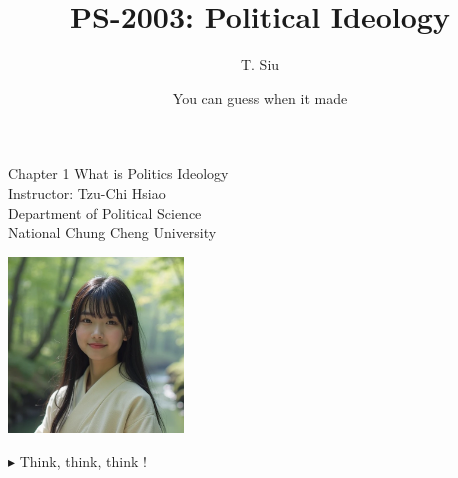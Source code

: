 \documentclass{beamer}
\title{PS-2003: Political Ideology}
\author{T. Siu}
\date{You can guess when it made}
\begin{document}
\begin{frame}
\begin{center}
\Large{Chapter 1 What is Politics Ideology} \\
\vspace{3em}
\normalsize{Instructor: Tzu-Chi Hsiao} \\
\vspace{3em}
\small{Department of Political Science} \\
\vspace{1em}
\small{National Chung Cheng University} \\
\end{center}
\end{frame}
\begin{frame}{}
\begin{center}
\includegraphics[width=0.35\textwidth]{present.png}
\end{center}
$\blacktriangleright$ Think, think, think ! \\
\end{frame}
\end{document}
